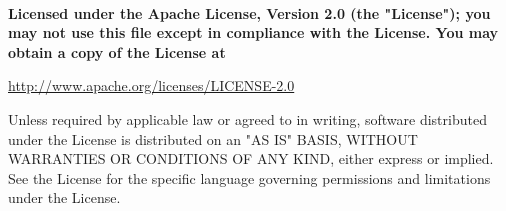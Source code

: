 %
%
%
~
\vfill{}
{\bf
%
Licensed under the Apache License, Version 2.0 (the "License"); you may not use
this file except in compliance with the License.  You may obtain a copy of the
License at 

\begin{center}
\href{http://www.apache.org/licenses/LICENSE-2.0}{http://www.apache.org/licenses/LICENSE-2.0}
\end{center}

Unless required by applicable law or agreed to in writing, software distributed
under the License is distributed on an "AS IS" BASIS, WITHOUT WARRANTIES OR
CONDITIONS OF ANY KIND, either express or implied.  See the License for the
specific language governing permissions and limitations under the License.
}
\clearpage
